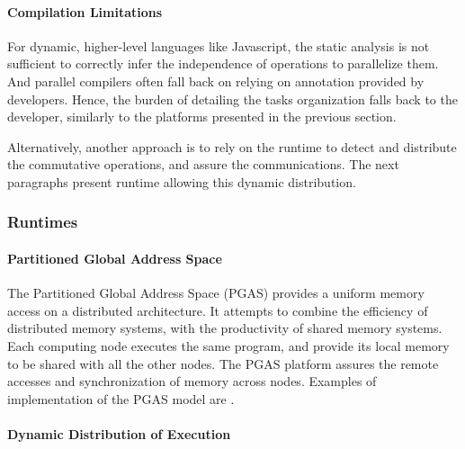 

\paragraph{Compilation Limitations}

For dynamic, higher-level languages like Javascript, the static analysis is not sufficient to correctly infer the independence of operations to parallelize them.
And parallel compilers often fall back on relying on annotation provided by developers.
Hence, the burden of detailing the tasks organization falls back to the developer, similarly to the platforms presented in the previous section.

Alternatively, another approach is to rely on the runtime to detect and distribute the commutative operations, and assure the communications.
The next paragraphs present runtime allowing this dynamic distribution.

\subsubsection{Runtimes} \label{chapter3:software-abstraction:runtimes}

\paragraph{Partitioned Global Address Space}

The Partitioned Global Address Space (PGAS) provides a uniform memory access on a distributed architecture.
It attempts to combine the efficiency of distributed memory systems, with the productivity of shared memory systems.
Each computing node executes the same program, and provide its local memory to be shared with all the other nodes.
The PGAS platform assures the remote accesses and synchronization of memory across nodes.
Examples of implementation of the PGAS model are .

\paragraph{Dynamic Distribution of Execution}

